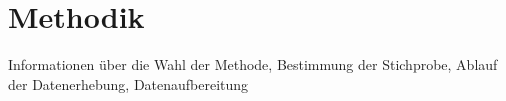\chapter{Methodik}

Informationen über die Wahl der Methode, Bestimmung der Stichprobe, Ablauf der Datenerhebung, Datenaufbereitung
